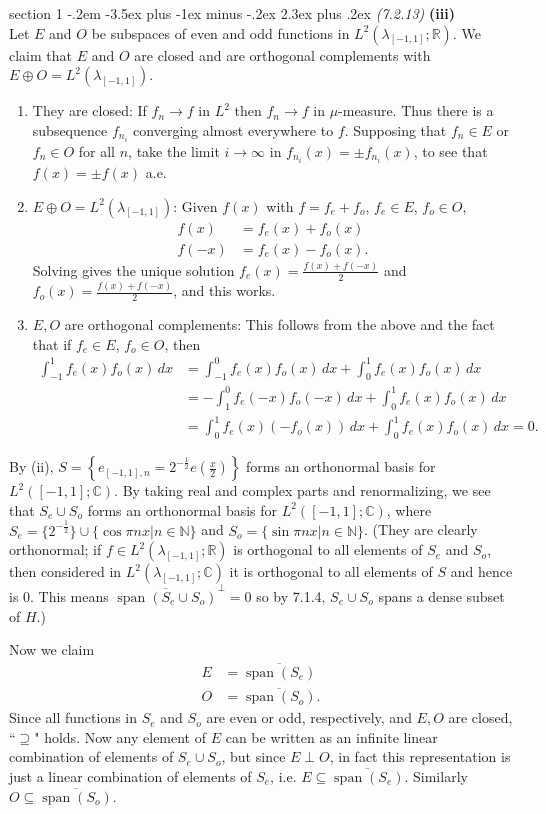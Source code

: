 \documentclass[12pt]{article}
\makeatletter
\theoremstyle{norm}
\newcommand{\C}[0]{\mathbb{C}}
\newcommand{\N}[0]{\mathbb{N}}
\newcommand{\R}[0]{\mathbb{R}}
\newcommand{\rc}[1]{\frac{1}{#1}}
\newcommand{\subeq}[0]{\subseteq}
\newcommand{\supeq}[0]{\supseteq}
\newcommand{\la}[0]{\lambda}
\newcommand{\bc}[1]{\left\{ {#1} \right\}}
\newcommand{\pa}[1]{\left( {#1} \right)}
\newcommand{\subprob}[1]{\noindent\textbf{#1}\\}
\newcommand{\spn}{\operatorname{span}}
\newcommand{\pf}[2]{\pa{\frac{#1}{#2}}}
\newcommand{\ol}[1]{\overline{#1}}
\newcommand{\iy}[0]{\infty}
\newenvironment{problem}{\@startsection
       {section}
       {1}
       {-.2em}
       {-3.5ex plus -1ex minus -.2ex}
       {2.3ex plus .2ex}
       {\pagebreak[3]%
       \large\bf\noindent{Problem }
       }
       }
       {%
       }
\makeatother
\begin{document}
\begin{problem}{\it (7.2.13)}
\subprob{(iii)}
Let $E$ and $O$ be subspaces of even and odd functions in $L^2(\la_{[-1,1]};\R)$. We claim that $E$ and $O$ are closed and are orthogonal complements with $E\oplus O=L^2(\la_{[-1,1]})$.
\begin{enumerate}
\item They are closed: If $f_n \to f$ in $L^2$ then $f_n\to f$ in $\mu$-measure. Thus there is a subsequence $f_{n_i}$ converging almost everywhere to $f$. 
Supposing that $f_n\in E$ or $f_n\in O$ for all $n$, take the limit $i\to \iy$ in $f_{n_i}(x)=\pm f_{n_i}(x)$, to see that $f(x)=\pm f(x)$ a.e.
\item $E\oplus O=L^2(\la_{[-1,1]})$: Given $f(x)$ with $f=f_e+f_o$, $f_e\in E$, $f_o\in O$,
\begin{align*}
f(x)&=f_e(x)+f_o(x)\\
f(-x)&=f_e(x)-f_o(x).
\end{align*}
Solving gives the unique solution $f_e(x)=\frac{f(x)+f(-x)}{2}$ and $f_o(x)=\frac{f(x)+f(-x)}2$, and this works.
\item $E,O$ are orthogonal complements: This follows from the above and the fact that if $f_e\in E$, $f_o\in O$, then
\begin{align*}
\int_{-1}^1 f_e(x)f_o(x)\,dx&=\int_{-1}^0 f_e(x)f_o(x)\,dx+\int_{0}^1 f_e(x)f_o(x)\,dx\\
&=-\int_{1}^0 f_e(-x)f_o(-x)\,dx+\int_{0}^1 f_e(x)f_o(x)\,dx\\
&=\int_0^1f_e(x)(-f_o(x))\,dx+\int_{0}^1 f_e(x)f_o(x)\,dx=0.
\end{align*}
\end{enumerate}
By (ii), $S=\bc{e_{[-1,1],n}=2^{-\rc2} e\pf{x}{2}}$ forms an orthonormal basis for $L^2([-1,1];\C)$. By taking real and complex parts and renormalizing, we see that $S_e\cup S_o$ forms an orthonormal basis for $L^2([-1,1];\C)$, where $S_e=\{2^{-\rc 2}\}\cup \{\cos\pi nx|n\in \N\}$ and $S_o=\{\sin\pi nx|n\in \N\}$. (They are clearly orthonormal; if $f\in L^2(\la_{[-1,1]};\R)$ is orthogonal to all elements of $S_e$ and $S_o$, then considered in $L^2(\la_{[-1,1]};\C)$ it is orthogonal to all elements of $S$ and hence is 0. This means $\ol{\spn(S_e\cup S_o)}^{\perp}=0$ so by 7.1.4, $S_e\cup S_o$ spans a dense subset of $H$.)

Now we claim
\begin{align*}
E&=\ol{\spn(S_e)}\\
O&=\ol{\spn(S_o)}.
\end{align*}
Since all functions in $S_e$ and $S_o$ are even or odd, respectively, and $E,O$ are closed, ``$\supeq$" holds. Now any element of $E$ can be written as an infinite linear combination of elements of $S_e\cup S_o$, but since $E\perp O$, in fact this representation is just a linear combination of elements of $S_e$, i.e. $E\subeq \ol{\spn(S_e)}$. Similarly $O\subeq \ol{\spn(S_o)}$.


\end{problem}
\end{document}
